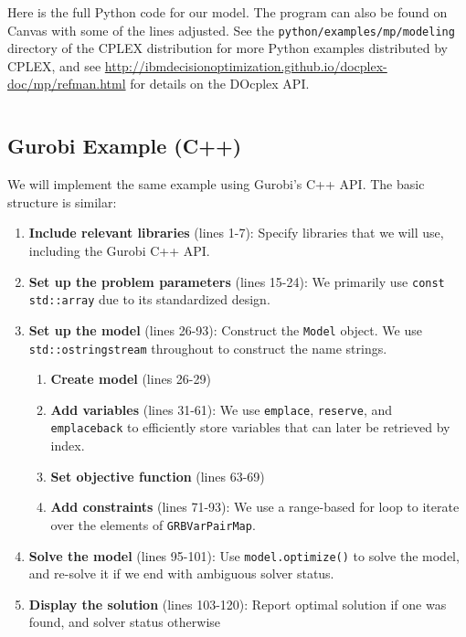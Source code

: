 \documentclass[12pt]{article}
\begin{document}
Here is the full Python code for our model. The program can also be found on Canvas with some of the lines adjusted. See the \texttt{python/examples/mp/modeling} directory of the CPLEX distribution for more Python examples distributed by CPLEX, and see \url{http://ibmdecisionoptimization.github.io/docplex-doc/mp/refman.html} for details on the DOcplex API.
\inputminted[fontsize=\small,linenos]{python}{code/shortlines/TWTdocplex.py}


\subsection{Gurobi Example (C++)}
We will implement the same example using Gurobi's C++ API. The basic structure is similar:
\begin{enumerate}
    \item \textbf{Include relevant libraries} (lines 1-7): Specify libraries that we will use, including the Gurobi C++ API.
    \item \textbf{Set up the problem parameters} (lines 15-24): We primarily use \texttt{const std::array} due to its standardized design.
    \item \textbf{Set up the model} (lines 26-93): Construct the \texttt{Model} object. We use \texttt{std::ostringstream} throughout to construct the name strings.
        \begin{enumerate}
            \item \textbf{Create model} (lines 26-29)
            \item \textbf{Add variables} (lines 31-61): We use \texttt{emplace}, \texttt{reserve}, and \texttt{emplace\ttul back} to efficiently store variables that can later be retrieved by index.
            \item \textbf{Set objective function} (lines 63-69)
            \item \textbf{Add constraints} (lines 71-93): We use a range-based for loop to iterate over the elements of \texttt{GRBVarPairMap}.
        \end{enumerate}
    \item \textbf{Solve the model} (lines 95-101): Use \texttt{model.optimize()} to solve the model, and re-solve it if we end with ambiguous solver status.
    \item \textbf{Display the solution} (lines 103-120): Report optimal solution if one was found, and solver status otherwise
\end{enumerate}
\end{document}
